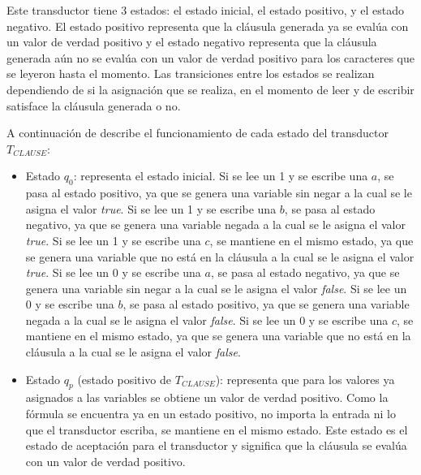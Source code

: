 \documentclass[12pt]{article}
\newcommand{\true}{\textit{true}}
\newcommand{\false}{\textit{false}}
\begin{document}
Este transductor tiene 3 estados: el estado inicial, el estado positivo, y el estado negativo.  
El estado positivo representa que la cláusula generada ya se evalúa con un valor de verdad positivo y 
el estado negativo representa que la cláusula generada aún no se evalúa con un valor de verdad positivo 
para los caracteres que se leyeron hasta el momento. Las transiciones entre los estados se realizan 
dependiendo de si la asignación que se realiza, en el momento de leer y de escribir satisface la cláusula 
generada o no.

A continuación de describe el funcionamiento de cada estado del transductor $T_{CLAUSE}$:
\begin{itemize}
    \item Estado $q_0$: representa el estado inicial.  Si se lee un 1 y se escribe una $a$, se pasa al
          estado positivo, ya que se genera una variable sin negar a la cual se le asigna el valor \true{}.  
          Si se lee un 1 y se escribe una $b$, se pasa al estado negativo, ya que se genera una variable negada 
          a la cual se le asigna el valor \true{}.  Si se lee un 1 y se escribe una $c$, se mantiene en el 
          mismo estado, ya que se genera una variable que no está en la cláusula a la cual se le asigna el 
          valor \true{}.  Si se lee un 0 y se escribe una $a$, se pasa al estado negativo, ya que se genera 
          una variable sin negar a la cual se le asigna el valor \false{}.  Si se lee un 0 y se escribe una 
          $b$, se pasa al estado positivo, ya que se genera una variable negada a la cual se le asigna el valor 
          \false{}.  Si se lee un 0 y se escribe una $c$, se mantiene en el mismo estado, ya que se genera una 
          variable que no está en la cláusula a la cual se le asigna el valor \false{}.
          
    \item Estado $q_p$ (estado positivo de $T_{CLAUSE}$): representa que para los valores ya asignados
          a las variables se obtiene un valor de verdad positivo.  Como la fórmula se encuentra ya en un estado 
          positivo, no importa la entrada ni lo que el transductor escriba, se mantiene en el mismo estado. 
          Este estado es el estado de aceptación para el transductor y significa que la cláusula se evalúa con un 
          valor de verdad positivo.
          

\end{itemize}
\end{document}
